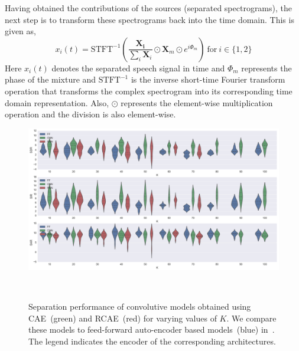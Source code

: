 \documentclass{article}
\begin{document}
Having obtained the contributions of the sources (separated spectrograms), the next step is to transform these spectrograms back into the time domain. This is given as,
\begin{equation}
    x_{i}(t) = \text{STFT}^{-1}\left(\frac{\mathbf{X_{i}}}{\sum_{i}\mathbf{X}_{i}}\odot \mathbf{X}_{m} \odot e^{i\Phi_{m}}\right)~\text{for}~i\in\{1, 2\}
\end{equation}
Here $x_{i}(t)$ denotes the separated speech signal in time and $\Phi_{m}$ represents the phase of the mixture and $\text{STFT}^{-1}$ is the inverse short-time Fourier transform operation that transforms the complex spectrogram into its corresponding time domain representation. Also, $\odot$ represents the element-wise multiplication operation and the division is also element-wise. \\

\begin{figure}[ht!]
\centering
  \includegraphics[clip, trim = 0cm 0cm 0cm 0cm, width=\linewidth]{Figs/FullPerformance.png}
  \caption{Separation performance of convolutive models obtained using CAE~(green) and RCAE~(red) for varying values of $K$. We compare these models to feed-forward auto-encoder based models~(blue) in~\cite{smaragdis2017aneural}. The legend indicates the encoder of the corresponding architectures. }~\label{fig:cnnseparation_performance}
\end{figure}
\end{document}

